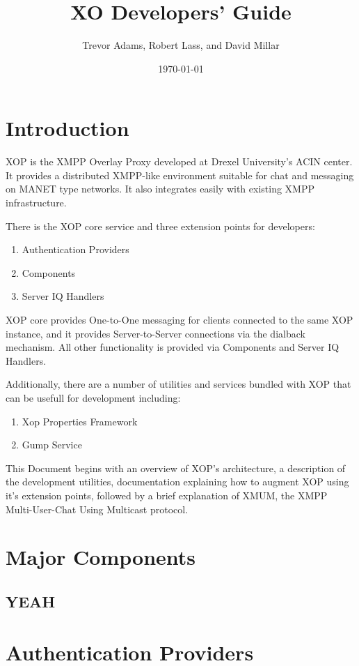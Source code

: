 \documentclass{article}
\title{XO Developers' Guide}
\date{\today}
\author{Trevor Adams, Robert Lass, and David Millar}
\begin{document}
\maketitle

\section{Introduction}
XOP is the XMPP Overlay Proxy developed at Drexel University's ACIN center.  It provides a
distributed XMPP-like environment suitable for chat and messaging on MANET type networks.
It also integrates easily with existing XMPP infrastructure.

There is the XOP core service and three extension points for developers:
\begin{enumerate}
\item Authentication Providers
\item Components
\item Server IQ Handlers
\end{enumerate}

XOP core provides One-to-One messaging for clients connected to the same XOP instance,
and it provides Server-to-Server connections via the dialback mechanism.
All other functionality is provided via Components and Server IQ Handlers.

Additionally, there are a number of utilities and services bundled with XOP
that can be usefull for development including:
\begin{enumerate}
\item Xop Properties Framework
\item Gump Service
\end{enumerate}

This Document begins with an overview of XOP's architecture, a
description of the development utilities, documentation
explaining how to augment XOP using it's extension points, followed by
a brief explanation of XMUM, the XMPP Multi-User-Chat Using Multicast protocol.


\section{Major Components}
\subsection{YEAH}
\section{Authentication Providers}
\end{document}
